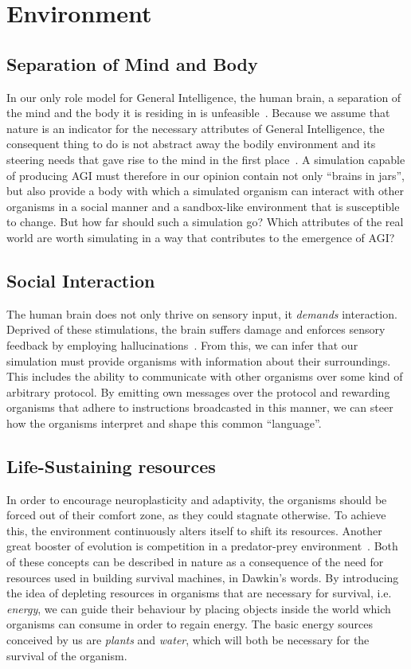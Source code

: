 \section{Environment}

\subsection{Separation of Mind and Body}
In our only role model for General Intelligence, the human brain, a separation of the mind and
the body it is residing in is unfeasible~\cite{Dudai2014}. Because we assume that nature is an 
indicator for the necessary attributes of General Intelligence, the consequent thing to do is not 
abstract away the bodily environment and its steering needs that gave rise to the mind in the first place~\cite{Jekely2010}. 
A simulation capable of producing AGI must therefore in our opinion contain not only ``brains in jars'', but 
also provide a body with which a simulated organism can interact with other organisms in a social manner and a 
sandbox-like environment that is susceptible to change.
But how far should such a simulation go? Which attributes of the real world are worth simulating in a way 
that contributes to the emergence of AGI\@?

\subsection{Social Interaction}
The human brain does not only thrive on sensory input, it
\emph{demands} interaction. Deprived of these stimulations,
the brain suffers damage and enforces sensory feedback by employing
hallucinations~\cite{Grassian2006}. From this, we can infer that
our simulation must provide organisms with information about their surroundings.
This includes the ability to communicate with other organisms over some
kind of arbitrary protocol. By emitting own messages over the protocol and
rewarding organisms that adhere to instructions broadcasted in this manner,
we can steer how the organisms interpret and shape this common ``language''.

\subsection{Life-Sustaining resources}
In order to encourage neuroplasticity and adaptivity, the organisms should be 
forced out of their comfort zone, as they could stagnate otherwise.
To achieve this, the environment continuously alters itself to shift its resources.
Another great booster of evolution is competition in a predator-prey environment~\cite{Dawkins1982}.
Both of these concepts can be described in nature as a consequence of the need for resources 
used in building survival machines, in Dawkin's words. 
By introducing the idea of depleting resources in organisms that are necessary for survival, 
i.e. \emph{energy}, we can guide their behaviour by placing objects inside the world which organisms can consume
in order to regain energy. The basic energy sources conceived by us are \emph{plants} and \emph{water}, which will
both be necessary for the survival of the organism.


